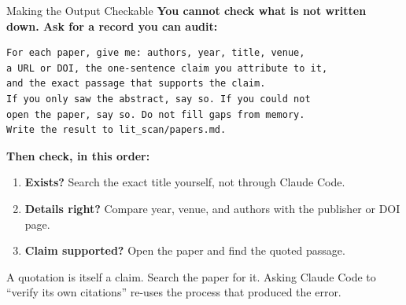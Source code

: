 \documentclass[aspectratio=169, 11pt]{beamer}
\begin{document}
\begin{frame}[fragile]{Making the Output Checkable}
  \textbf{You cannot check what is not written down. Ask for a record you can audit:}

  \vspace{0.3em}
  \begin{lstlisting}[basicstyle=\ttfamily\scriptsize]
For each paper, give me: authors, year, title, venue,
a URL or DOI, the one-sentence claim you attribute to it,
and the exact passage that supports the claim.
If you only saw the abstract, say so. If you could not
open the paper, say so. Do not fill gaps from memory.
Write the result to lit_scan/papers.md.
  \end{lstlisting}

  \vspace{0.3em}
  \textbf{Then check, in this order:}
  \begin{enumerate}\small
    \item \textbf{Exists?} Search the exact title yourself, not through Claude Code.
    \item \textbf{Details right?} Compare year, venue, and authors with the publisher or DOI page.
    \item \textbf{Claim supported?} Open the paper and find the quoted passage.
  \end{enumerate}

  \vspace{0.2em}
  {\small A quotation is itself a claim. Search the paper for it. Asking Claude Code to ``verify its own citations'' re-uses the process that produced the error.}
\end{frame}
\end{document}
